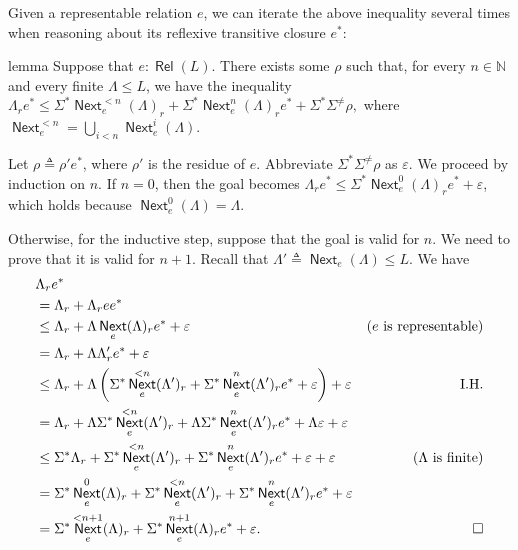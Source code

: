 \documentclass[11pt,a4paper]{amsart}
\theoremstyle{definition}
\DeclareMathOperator{\Next}{\mathsf{Next}}
\DeclareMathOperator{\Rel}{\mathsf{Rel}}
\begin{document}
Given a representable relation $e$, we can iterate the above inequality several
times when reasoning about its reflexive transitive closure $e^*$:

\begin{theoremEnd}{lemma}
  \label{lem:representable-star}
  Suppose that $e : \Rel(L)$.  There exists some $ \rho $ such that, for every
  $n  \in  \mathbb{N}$ and every finite $ \Lambda   \leq  L$, we have the inequality
  \(  \Lambda _re^*  \leq   \Sigma ^*\Next_e^{<n}( \Lambda )_r +  \Sigma ^*\Next_e^n( \Lambda )_re^* +  \Sigma ^* \Sigma ^{ \neq } \rho , \) where
  $\Next_e^{<n} =  \bigcup _{i < n}\Next_e^i( \Lambda )$.
\end{theoremEnd}

\begin{proofEnd} %
  Let $ \rho   \triangleq   \rho 'e^*$, where $ \rho '$ is the residue of $e$. Abbreviate $ \Sigma ^* \Sigma ^{ \neq } \rho $ as
  $ \varepsilon $.  We proceed by induction on $n$.  If $n = 0$, then the goal becomes
  $ \Lambda _r e^*  \leq   \Sigma ^*\Next_e^0( \Lambda )_re^* +  \varepsilon $, which holds because $\Next_e^0( \Lambda ) =  \Lambda $.

  Otherwise, for the inductive step, suppose that the goal is valid for $n$.  We
  need to prove that it is valid for $n + 1$.  Recall that
  $ \Lambda '  \triangleq  \Next_e( \Lambda )  \leq  L$. We have
  \begin{align*}
    &  \Lambda _re^* \\
    & =  \Lambda _r +  \Lambda _ree^* \\
    &  \leq   \Lambda _r +  \Lambda \Next_e( \Lambda )_re^* +  \varepsilon 
    & \text{($e$ is representable)} \\
    & =  \Lambda _r +  \Lambda  \Lambda '_re^* +  \varepsilon  \\
    &  \leq   \Lambda _r %
      +  \Lambda \left( \Sigma ^*\Next_e^{<n}( \Lambda ')_r+ \Sigma ^*\Next_e^n( \Lambda ')_re^* +  \varepsilon \right) +  \varepsilon 
    & \text{I.H.} \\
    & =  \Lambda _r +  \Lambda  \Sigma ^*\Next_e^{<n}( \Lambda ')_r+ \Lambda  \Sigma ^*\Next_e^n( \Lambda ')_re^* +  \Lambda  \varepsilon  +  \varepsilon  \\
    &  \leq   \Sigma ^* \Lambda _r +  \Sigma ^*\Next_e^{<n}( \Lambda ')_r+ \Sigma ^*\Next_e^{n}( \Lambda ')_re^* +  \varepsilon  +  \varepsilon 
    & \text{($ \Lambda $ is finite)} \\
    & =  \Sigma ^*\Next_e^0( \Lambda )_r +  \Sigma ^*\Next_e^{<n}( \Lambda ')_r+ \Sigma ^*\Next_e^{n}( \Lambda ')_re^* +  \varepsilon  \\
    & =  \Sigma ^*\Next_e^{<n+1}( \Lambda )_r +  \Sigma ^*\Next_e^{n+1}( \Lambda )_re^* +  \varepsilon . & \qedhere
  \end{align*}
\end{proofEnd}
\end{document}
